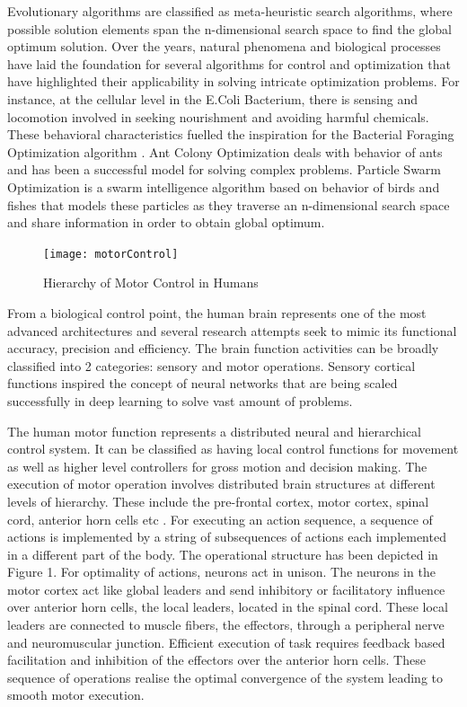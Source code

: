 \documentclass[a4paper,twoside]{article}
\begin{document}
Evolutionary algorithms are classified as meta-heuristic search algorithms, where possible solution elements span the n-dimensional search space to find the global optimum solution. Over the years, natural phenomena and biological processes have laid the foundation for several algorithms for control and optimization that have highlighted their applicability in solving intricate optimization problems. For instance, at the cellular level in the E.Coli Bacterium, there is sensing and locomotion involved in seeking nourishment and avoiding harmful chemicals. These behavioral characteristics fuelled the inspiration for the Bacterial Foraging Optimization algorithm \cite{passino2002biomimicry}\cite{onwubolu2013new}. Ant Colony Optimization \cite{dorigo2010ant} deals with behavior of ants and has been a successful model for solving complex problems. Particle Swarm Optimization \cite{kennedy2011particle} is a swarm intelligence algorithm based on behavior of birds and fishes that models these particles as they traverse an n-dimensional search space and share information in order to obtain global optimum.
\begin{figure}[b!]
  \texttt{[image: motorControl]}
  \caption{Hierarchy of Motor Control in Humans}
  \label{fig:motorControl}
\end{figure}
From a biological control point, the human brain represents one of the most advanced architectures and several research attempts seek to mimic its functional accuracy, precision and efficiency. The brain function activities can be broadly classified into 2 categories: sensory and motor operations. Sensory cortical functions inspired the concept of neural networks that are being scaled successfully in deep learning to solve vast amount of problems.



The human motor function represents a distributed neural and hierarchical control system. It can be classified as having local control functions for movement as well as higher level controllers for gross motion and decision making. The execution of motor operation involves distributed brain structures at different levels of hierarchy. These include the pre-frontal cortex, motor cortex, spinal cord, anterior horn cells etc \cite{Shaw1982119}. For executing an action sequence, a sequence of actions is implemented by a string of subsequences of actions each implemented in a different part of the body. The operational structure has been depicted in Figure 1\cite{passino2005biomimicry}.
For optimality of actions, neurons act in unison. The neurons in the motor cortex act like global leaders and send inhibitory or facilitatory influence over anterior horn cells, the local leaders, located in the spinal cord\cite{Shaw1982119}. These local leaders are connected to muscle fibers, the effectors, through a peripheral nerve and neuromuscular junction.
Efficient execution of task requires feedback based facilitation and inhibition of the effectors over the anterior horn cells. These sequence of operations realise the optimal convergence of the system leading to smooth motor execution.
\end{document}
